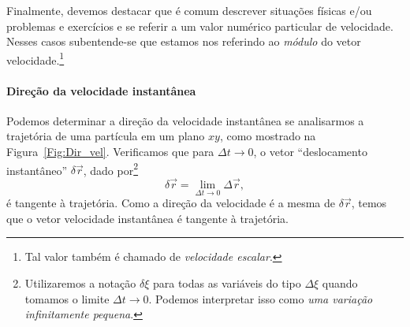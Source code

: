 Finalmente, devemos destacar que é comum descrever situações físicas e/ou problemas e exercícios e se referir a um valor numérico particular de velocidade. Nesses casos subentende-se que estamos nos referindo ao \emph{módulo} do vetor velocidade.\footnote{Tal valor também é chamado de \emph{velocidade escalar}.}

\paragraph{Direção da velocidade instantânea}

Podemos determinar a direção da velocidade instantânea se analisarmos a trajetória de uma partícula em um plano $xy$, como mostrado na Figura~\ref{Fig:Dir_vel}. Verificamos que para $\Delta t \to 0$, o vetor ``deslocamento instantâneo'' $\delta\vec{r}$, dado por\footnote[][-2cm]{Utilizaremos a notação $\delta \xi$ para todas as variáveis do tipo $\Delta \xi$ quando tomamos o limite $\Delta t \to 0$. Podemos interpretar isso como \emph{uma variação infinitamente pequena}.}
\begin{equation}
    \delta\vec{r} = \lim_{\Delta t \to 0}\Delta \vec{r},
\end{equation}
%
é tangente à trajetória. Como a direção da velocidade é a mesma de $\delta\vec{r}$, temos que o vetor velocidade instantânea é tangente à trajetória.

